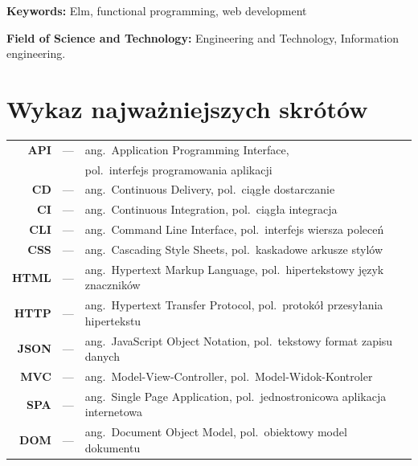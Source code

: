 \documentclass[twoside,a4paper]{report}
\begin{document}
\textbf{Keywords:} Elm, functional programming, web development

\textbf{Field of Science and Technology:} Engineering and Technology, Information engineering.


\tableofcontents


\chapter*{Wykaz najważniejszych skrótów}
\begin{tabular}{rcl}
    \textbf{API}  & ---& ang.~Application Programming Interface,\\
                  &    & pol.~interfejs programowania aplikacji\\
    \textbf{CD}   & ---& ang.~Continuous Delivery, pol.~ciągłe dostarczanie\\
    \textbf{CI}   & ---& ang.~Continuous Integration, pol.~ciągła integracja\\
    \textbf{CLI}  & ---& ang.~Command Line Interface, pol.~interfejs wiersza poleceń\\
    \textbf{CSS}  & ---& ang.~Cascading Style Sheets, pol.~kaskadowe arkusze stylów\\
    \textbf{HTML} & ---& ang.~Hypertext Markup Language, pol.~hipertekstowy język znaczników\\
    \textbf{HTTP} & ---& ang.~Hypertext Transfer Protocol, pol.~protokół przesyłania hipertekstu\\
    \textbf{JSON} & ---& ang.~JavaScript Object Notation, pol.~tekstowy format zapisu danych\\
    \textbf{MVC}  & ---& ang.~Model-View-Controller, pol.~Model-Widok-Kontroler\\
    \textbf{SPA}  & ---& ang.~Single Page Application, pol.~jednostronicowa aplikacja internetowa\\
    \textbf{DOM}  & ---& ang.~Document Object Model, pol.~obiektowy model dokumentu\\
\end{tabular}

\end{document}
